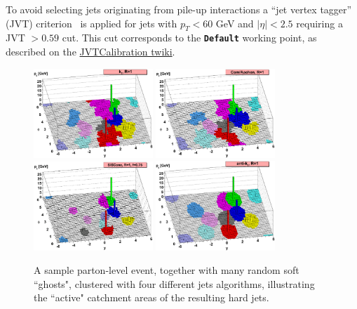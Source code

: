 To avoid selecting jets originating from pile-up interactions a ``jet vertex tagger'' (JVT) criterion~\cite{ATLAS-JVTPaper} is applied for jets with $p_T < 60$ GeV and $|\eta|< 2.5$ requiring a JVT $ > 0.59$ cut. This cut corresponds to the \texttt{\textbf{Default}} working point, as described on the \href{https://twiki.cern.ch/twiki/bin/view/AtlasProtected/JVTCalibration}{JVTCalibration twiki}.



\begin{figure}[h]
\begin{center}
\includegraphics*[width=0.40\textwidth] {figures/kt_stuff/kt}
\includegraphics*[width=0.40\textwidth] {figures/kt_stuff/ca}\\
\includegraphics*[width=0.40\textwidth] {figures/kt_stuff/siscone}
\includegraphics*[width=0.40\textwidth] {figures/kt_stuff/antikt}
\caption[A sample parton-level event]{A sample parton-level event, together with many random soft
``ghosts", clustered with four different jets algorithms, illustrating the ``active" catchment areas of
the resulting hard jets\cite{Cacciari:2008gp}.}
\label{fig:jetalgo}
\end{center}
\end{figure}

